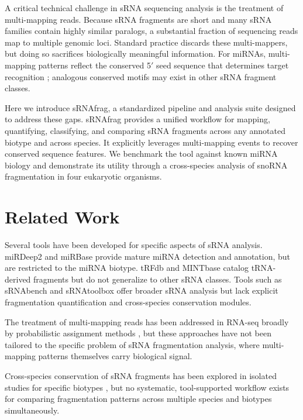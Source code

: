 \documentclass[11pt]{article}
\begin{document}
A critical technical challenge in sRNA sequencing analysis is the treatment of multi-mapping reads. Because sRNA fragments are short and many sRNA families contain highly similar paralogs, a substantial fraction of sequencing reads map to multiple genomic loci. Standard practice discards these multi-mappers, but doing so sacrifices biologically meaningful information. For miRNAs, multi-mapping patterns reflect the conserved 5$'$ seed sequence that determines target recognition \citep{lewis2005}; analogous conserved motifs may exist in other sRNA fragment classes.

Here we introduce sRNAfrag, a standardized pipeline and analysis suite designed to address these gaps. sRNAfrag provides a unified workflow for mapping, quantifying, classifying, and comparing sRNA fragments across any annotated biotype and across species. It explicitly leverages multi-mapping events to recover conserved sequence features. We benchmark the tool against known miRNA biology and demonstrate its utility through a cross-species analysis of snoRNA fragmentation in four eukaryotic organisms.

\section{Related Work}

Several tools have been developed for specific aspects of sRNA analysis. miRDeep2 \citep{friedlander2012} and miRBase \citep{kozomara2019} provide mature miRNA detection and annotation, but are restricted to the miRNA biotype. tRFdb \citep{kumar2015} and MINTbase \citep{pliatsika2018} catalog tRNA-derived fragments but do not generalize to other sRNA classes. Tools such as sRNAbench \citep{barturen2014} and sRNAtoolbox \citep{rueda2015} offer broader sRNA analysis but lack explicit fragmentation quantification and cross-species conservation modules.

The treatment of multi-mapping reads has been addressed in RNA-seq broadly by probabilistic assignment methods \citep{li2010,patro2017}, but these approaches have not been tailored to the specific problem of sRNA fragmentation analysis, where multi-mapping patterns themselves carry biological signal.

Cross-species conservation of sRNA fragments has been explored in isolated studies for specific biotypes \citep{ender2008,taft2009}, but no systematic, tool-supported workflow exists for comparing fragmentation patterns across multiple species and biotypes simultaneously.
\end{document}
